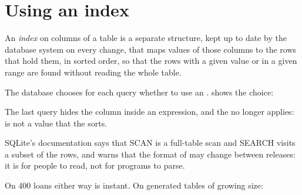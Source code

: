 \section{Using an index}\label{sec:b2:database-design:index}

\begin{definition}[Index]\label{def:b2:database-design:index}
An \emph{index} on columns of a table is a separate structure, kept up to date by the database
system on every change, that maps values of those columns to the rows that hold them, in sorted order, so that the rows
with a given value or in a given range are found without reading the whole table.
\end{definition}

The database chooses for each query whether to use an .  shows the choice:

\label{lst:b2:database-design:explain}

\label{out:b2:database-design:explain}

The last query hides the column inside an expression, and the  no longer applies:  is not a
value that the  sorts.

\begin{inpractice}
SQLite's documentation says that SCAN is a full-table scan and SEARCH visits a subset of the rows, and warns that the
format of  may change between releases: it is for people to read, not for programs to parse.
\end{inpractice}

On 400 loans either way is instant. On generated tables of growing size:

\label{lst:b2:database-design:index-timing}

\label{out:b2:database-design:index-timing}

